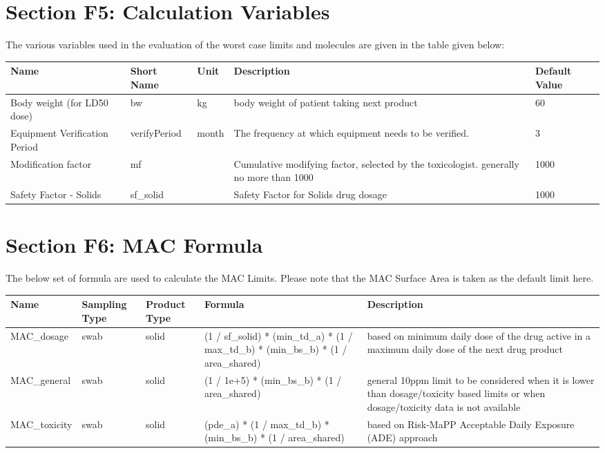\documentclass{article}
\begin{document}
        
        \newpage
        \section{Section F5: Calculation Variables}
        The various variables used in the evaluation of the worst case limits and molecules are given in the table given below:
        \begin{longtable}[l]{ |p{5cm} |p{2cm} |p{1.5cm} |p{6cm} |p{2.5cm}|  }
        \hline

        Name & Short Name & Unit & Description & Default Value\\

        \hline

    Body weight (for LD50 dose) & bw & kg & body weight of patient taking next product & 60\\
\hline
Equipment Verification Period & verifyPeriod & month & The frequency at which equipment needs to be verified. & 3\\
\hline
Modification factor & mf &  & Cumulative modifying factor, selected by the toxicologist. generally no more than 1000 & 1000\\
\hline
Safety Factor - Solids & sf\_solid &  & Safety Factor for Solids drug dosage & 1000\\
\hline

    \end{longtable}
    
        
    \newpage
    \section{Section F6: MAC Formula}
    The below set of formula are used to calculate the MAC Limits. Please note that the MAC Surface Area is taken as the default limit here.
    \begin{longtable}[l]{ |p{2cm} |p{1.5cm} |p{1.5cm} |p{5cm} |p{6cm}|  }
    \hline

    Name & Sampling Type & Product Type & Formula & Description\\

    \hline

    MAC\_dosage & swab & solid & (1 / sf\_solid) * (min\_td\_a) * (1 / max\_td\_b) * (min\_bs\_b) * (1 / area\_shared) & based on minimum daily dose of the drug active in a maximum daily dose of the next drug product\\
\hline
MAC\_general & swab & solid & (1 / 1e+5) * (min\_bs\_b) * (1 / area\_shared) & general 10ppm limit to be considered when it is lower than dosage/toxicity based limits or when dosage/toxicity data is not available\\
\hline
MAC\_toxicity & swab & solid & (pde\_a) * (1 / max\_td\_b) * (min\_bs\_b) * (1 / area\_shared) & based on Risk-MaPP Acceptable Daily Exposure (ADE) approach\\
\hline

    \end{longtable}
    
\end{document}
